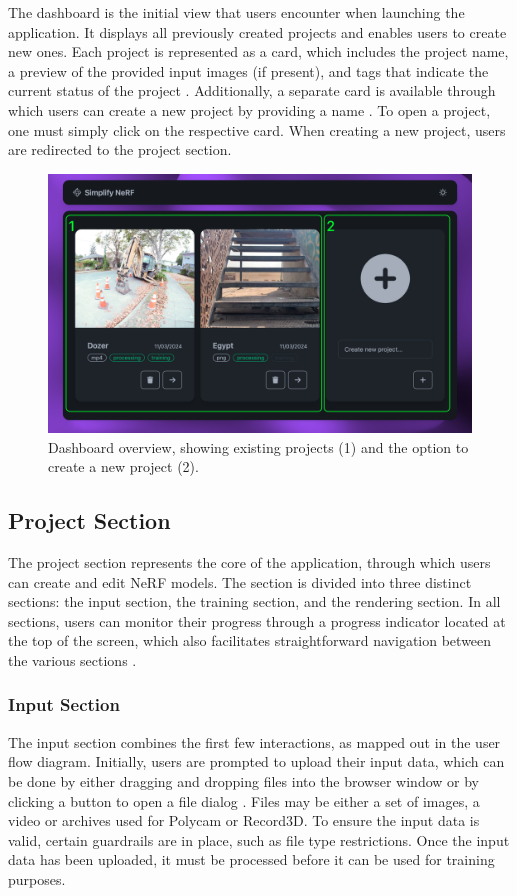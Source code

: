 The dashboard is the initial view that users encounter when launching the application.
It displays all previously created projects and enables users to create new ones.
Each project is represented as a card, which includes the project name, a preview of the provided input images (if present), and tags that indicate the current status of the project .
Additionally, a separate card is available through which users can create a new project by providing a name .
To open a project, one must simply click on the respective card.
When creating a new project, users are redirected to the project section.

\begin{figure}[htb]
  \centering
  \includegraphics[width=.65\textwidth]{figures/view-overview.png}
  \caption{Dashboard overview, showing existing projects (1) and the option to create a new project (2).}
  \label{fig:design:dashboard}
\end{figure}

\subsection*{Project Section}

The project section represents the core of the application, through which users can create and edit NeRF models.
The section is divided into three distinct sections: the input section, the training section, and the rendering section.
In all sections, users can monitor their progress through a progress indicator located at the top of the screen, which also facilitates straightforward navigation between the various sections .

\subsubsection*{Input Section}

The input section combines the first few interactions, as mapped out in the user flow diagram.
Initially, users are prompted to upload their input data, which can be done by either dragging and dropping files into the browser window or by clicking a button to open a file dialog .
Files may be either a set of images, a video or archives used for Polycam or Record3D.
To ensure the input data is valid, certain guardrails are in place, such as file type restrictions.
Once the input data has been uploaded, it must be processed before it can be used for training purposes.


